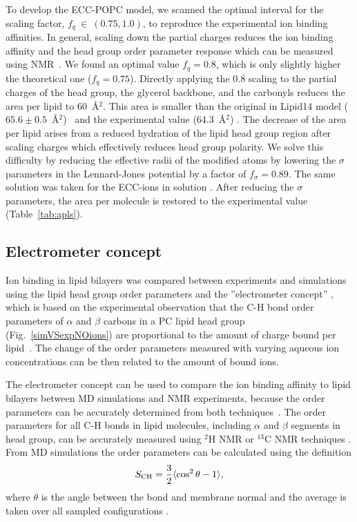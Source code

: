 \documentclass[aip,jcp,twocolumn]{revtex4}
\begin{document}
To develop the ECC-POPC model, we scanned the optimal interval for the scaling factor, $f_q~\in~(0.75, 1.0)$, to reproduce the experimental ion binding affinities. In general, scaling down the partial charges reduces the ion binding affinity and the head group order parameter response which can be measured using NMR~\cite{akutsu81, altenbach84, scherer89}. We found an optimal value $f_q = 0.8$, which is only slightly higher the theoretical one ($f_q=0.75$). Directly applying the 0.8 scaling to the partial charges of the head group, the glycerol backbone, and the carbonyls reduces the area per lipid to 60~\AA$^2$. This area is smaller than the original in Lipid14 model ($65.6 \pm 0.5$~\AA$^2$)~\cite{dickson14} and the experimental value (64.3~\AA$^2$) \cite{kucerka11}. The decrease of the area per lipid arises from a reduced hydration of the lipid head group region after scaling charges which effectively reduces head group polarity. 
We solve this difficulty by reducing the effective radii of the modified atoms by lowering the $\sigma$ parameters in the Lennard-Jones potential by a factor of $f_\sigma = 0.89$. The same solution was taken for the ECC-ions in solution \cite{kohagen14, kohagen16, Pluharova2014}. After reducing the $\sigma$ parameters, the area per molecule is restored to the experimental value (Table~\ref{tab:apls}). 




\subsection{Electrometer concept} \label{section:electrometer}
Ion binding in lipid bilayers was compared between experiments and simulations 
using the lipid head group order parameters and the
''electrometer concept'' \cite{seelig87,catte16}, which
is based on the experimental observation that the C-H bond
order parameters of $\alpha$ and $\beta$ carbons in a PC lipid head group
(Fig.~\ref{simVSexpNOions}) are proportional to the amount 
of charge bound per lipid~\cite{seelig87}.
The change of the order parameters measured with varying aqueous
ion concentrations can be then related to the amount of bound ions.

The electrometer concept can be used to compare the ion binding affinity to lipid 
bilayers between MD simulations and  NMR experiments, because the order
parameters can be accurately determined from both techniques~\cite{catte16,ollila16}.
The order parameters for all C-H bonds in lipid molecules, including
$\alpha$ and $\beta$ segments in head group, can be accurately measured
using $^2$H NMR or $^{13}$C NMR techniques \cite{ollila16}. From MD simulations the
order parameters can be calculated using the definition
\begin{equation}\label{OP}
S_{\rm CH}=\frac{3}{2}\langle \cos^2\theta -1 \rangle,
\end{equation}
where $\theta$ is the angle between the bond and membrane
normal and the average is taken over all sampled configurations \cite{ollila16}.
\end{document}
